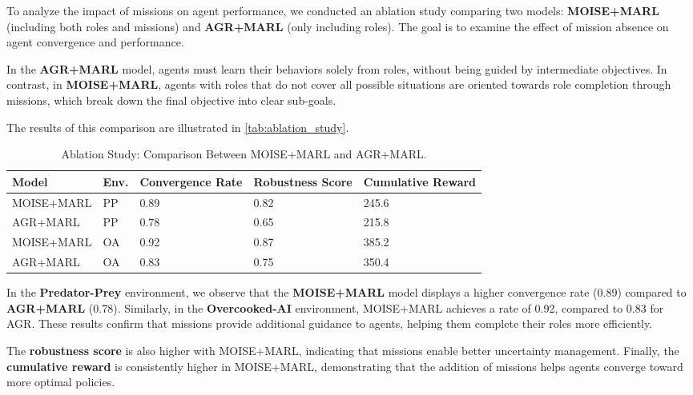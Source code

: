 \documentclass[sigconf,anonymous]{aamas}
\begin{document}
To analyze the impact of missions on agent performance, we conducted an ablation study comparing two models: \textbf{MOISE+MARL} (including both roles and missions) and \textbf{AGR+MARL} (only including roles). The goal is to examine the effect of mission absence on agent convergence and performance.

In the \textbf{AGR+MARL} model, agents must learn their behaviors solely from roles, without being guided by intermediate objectives. In contrast, in \textbf{MOISE+MARL}, agents with roles that do not cover all possible situations are oriented towards role completion through missions, which break down the final objective into clear sub-goals.

The results of this comparison are illustrated in \autoref{tab:ablation_study}.

\begin{table}[h!]
    \centering
    \caption{Ablation Study: Comparison Between MOISE+MARL and AGR+MARL.}
    \label{tab:ablation_study}
    \small %
    \renewcommand{\arraystretch}{1.1} %
    \begin{tabular}{p{1.7cm}p{0.7cm}p{1.4cm}p{1.4cm}p{1.4cm}}
        \hline
        \textbf{Model} & \textbf{Env.} & \textbf{Convergence Rate} & \textbf{Robustness Score} & \textbf{Cumulative Reward} \\ \hline
        MOISE+MARL & PP & 0.89 & 0.82 & 245.6 \\
        AGR+MARL & PP & 0.78 & 0.65 & 215.8 \\
        MOISE+MARL & OA & 0.92 & 0.87 & 385.2 \\
        AGR+MARL & OA & 0.83 & 0.75 & 350.4 \\ \hline
    \end{tabular}
\end{table}

In the \textbf{Predator-Prey} environment, we observe that the \textbf{MOISE+MARL} model displays a higher convergence rate (0.89) compared to \textbf{AGR+MARL} (0.78). Similarly, in the \textbf{Overcooked-AI} environment, MOISE+MARL achieves a rate of 0.92, compared to 0.83 for AGR. These results confirm that missions provide additional guidance to agents, helping them complete their roles more efficiently.

The \textbf{robustness score} is also higher with MOISE+MARL, indicating that missions enable better uncertainty management. Finally, the \textbf{cumulative reward} is consistently higher in MOISE+MARL, demonstrating that the addition of missions helps agents converge toward more optimal policies.
\end{document}
